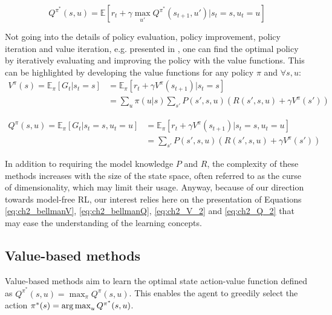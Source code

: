 \begin{equation}
\label{eq:ch2_bellmanQ}
    Q^{\pi^*}(s, u) = \mathbb{E}[r_t + \gamma \max_{u'} Q^{\pi^*}(s_{t+1}, u') |s_t=s, u_t=u]
\end{equation}

Not going into the details of policy evaluation, policy improvement, policy iteration and value iteration, e.g. presented in \citep{sutton2018reinforcement}, one can find the optimal policy by iteratively evaluating and improving the policy with the value functions.
This can be highlighted by developing the value functions for any policy $\pi$ and $\forall s, u$:
\begin{equation}
\label{eq:ch2_V_2}
\begin{split}
    V^\pi(s)= \mathbb{E}_{\pi}\left[G_t|s_t=s\right] & = \mathbb{E}_{\pi}\left[r_t + \gamma V^\pi(s_{t+1})|s_t=s\right]\\
     & = \sum_{u} \pi(u|s) \sum_{s'} P(s', s, u) (R(s', s, u) + \gamma V^\pi(s'))
\end{split}
\end{equation}

\begin{equation}
\label{eq:ch2_Q_2}
\begin{split}
    Q^\pi(s, u) = \mathbb{E}_{\pi}\left[G_t|s_t=s, u_t=u\right] & = \mathbb{E}_{\pi}\left[r_t + \gamma V^\pi(s_{t+1})|s_t=s, u_t=u \right] \\
    &  = \sum_{s'} P(s', s, u) (R(s', s, u) + \gamma V^\pi(s'))
\end{split}
\end{equation}

In addition to requiring the model knowledge $P$ and $R$, the complexity of these methods increases with the size of the state space, often referred to as the curse of dimensionality, which may limit their usage.
Anyway, because of our direction towards model-free RL, our interest relies here on the presentation of Equations \ref{eq:ch2_bellmanV}, \ref{eq:ch2_bellmanQ}, \ref{eq:ch2_V_2} and \ref{eq:ch2_Q_2} that may ease the understanding of the learning concepts.


\subsection{Value-based methods} \label{sec:ch2_value_based_methods}
Value-based methods aim to learn the optimal state action-value function defined as $Q^{\pi^*}(s, u)=\max_{\pi}Q^\pi(s, u)$.
This enables the agent to greedily select the action $\pi^*(s)=\operatorname*{arg\,max}_u Q^{\pi^*}(s, u)$.

